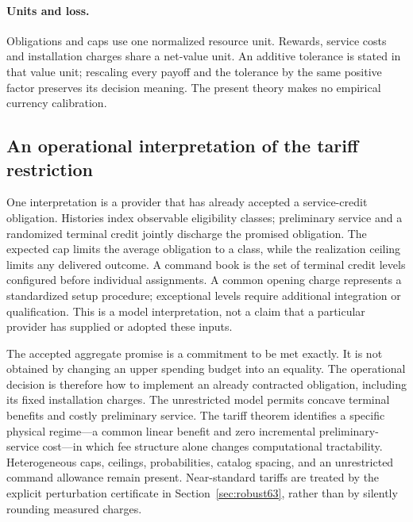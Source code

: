 \documentclass[11pt,letterpaper]{article}
\theoremstyle{definition}\newtheorem{remark}[theorem]{Remark}
\begin{document}
\paragraph{Units and loss.} Obligations and caps use one normalized resource unit. Rewards, service costs and installation charges share a net-value unit. An additive tolerance is stated in that value unit; rescaling every payoff and the tolerance by the same positive factor preserves its decision meaning. The present theory makes no empirical currency calibration.
\subsection{An operational interpretation of the tariff restriction}\label{sec:institution63}
One interpretation is a provider that has already accepted a service-credit obligation. Histories index observable eligibility classes; preliminary service and a randomized terminal credit jointly discharge the promised obligation. The expected cap limits the average obligation to a class, while the realization ceiling limits any delivered outcome. A command book is the set of terminal credit levels configured before individual assignments. A common opening charge represents a standardized setup procedure; exceptional levels require additional integration or qualification. This is a model interpretation, not a claim that a particular provider has supplied or adopted these inputs.

The accepted aggregate promise is a commitment to be met exactly. It is not obtained by changing an upper spending budget into an equality. The operational decision is therefore how to implement an already contracted obligation, including its fixed installation charges. The unrestricted model permits concave terminal benefits and costly preliminary service. The tariff theorem identifies a specific physical regime---a common linear benefit and zero incremental preliminary-service cost---in which fee structure alone changes computational tractability. Heterogeneous caps, ceilings, probabilities, catalog spacing, and an unrestricted command allowance remain present. Near-standard tariffs are treated by the explicit perturbation certificate in Section~\ref{sec:robust63}, rather than by silently rounding measured charges.
\end{document}
